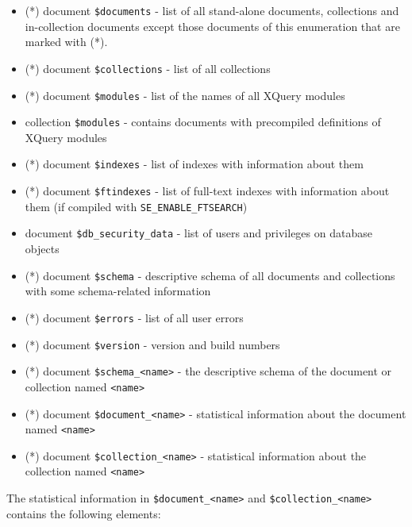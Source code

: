 \documentclass[a4paper,12pt]{article}
\begin{document}
\begin{itemize}
\item (*) document \verb!$documents! - list of all stand-alone documents, collections and in-collection documents except those documents of this enumeration that are marked with (*).
\item (*) document \verb!$collections! - list of all collections
\item (*) document \verb!$modules! - list of the names of all XQuery modules
\item collection \verb!$modules! - contains documents with precompiled definitions of XQuery modules
\item (*) document \verb!$indexes! - list of indexes with information about them
\item (*) document \verb!$ftindexes! - list of full-text indexes with information about them (if compiled with \verb!SE_ENABLE_FTSEARCH!)
\item document \verb!$db_security_data! - list of users and privileges on database objects
\item (*) document \verb!$schema! - descriptive schema of all documents and collections with some schema-related  information
\item (*) document \verb!$errors! - list of all user errors
\item (*) document \verb!$version! - version and build numbers
\item (*) document \verb!$schema_<name>! - the descriptive schema of the document or collection named \verb!<name>!
\item (*) document \verb!$document_<name>! - statistical information about the document named \verb!<name>!
\item (*) document \verb!$collection_<name>! - statistical information about the collection named \verb!<name>!
\end{itemize}


The statistical information in \verb!$document_<name>! and \verb!$collection_<name>! contains the following elements:
\end{document}
